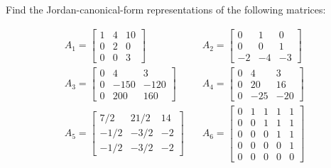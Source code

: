 \item Find the Jordan-canonical-form representations of the following matrices:

\begin{align*}
 A_1 = \begin{bmatrix}
        1 & 4 &10\\
        0 & 2 & 0\\
        0 & 0 & 3
       \end{bmatrix}
& \quad
A_2 = \begin{bmatrix}
        0 & 1 & 0\\
        0 & 0 & 1\\
        -2 & -4 & -3
       \end{bmatrix}
\\
A_3 = \begin{bmatrix}
        0 & 4 & 3\\
        0 & -150 & -120\\
        0 & 200 & 160
       \end{bmatrix}
& \quad
A_4 = \begin{bmatrix}
        0 & 4 & 3\\
        0 & 20 & 16\\
        0 & -25 & -20
       \end{bmatrix}
\\
A_5 = \begin{bmatrix}
        7/2 & 21/2 & 14\\
        -1/2 & -3/2 & -2\\
        -1/2 & -3/2 &-2
       \end{bmatrix}
& \quad
A_6 = \begin{bmatrix}
        0 & 1 & 1 & 1 & 1\\
        0 & 0 & 1 & 1 & 1\\
        0 & 0 & 0 & 1 & 1\\
        0 & 0 & 0 & 0 & 1\\
        0 & 0 & 0 & 0 & 0
       \end{bmatrix}
\end{align*}
